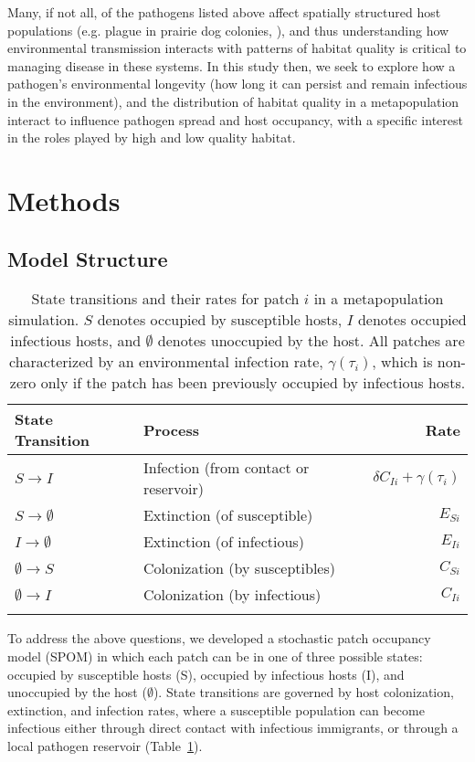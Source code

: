 \documentclass{svjour3}
\begin{document}
Many, if not all, of the pathogens listed above affect spatially structured host populations (e.g. plague in prairie dog colonies, \cite{George2013}), and thus understanding how environmental transmission interacts with patterns of habitat quality is critical to managing disease in these systems.  In this study then, we seek to explore how a pathogen's environmental longevity (how long it can persist and remain infectious in the environment), and the distribution of habitat quality in a metapopulation interact to influence pathogen spread and host occupancy, with a specific interest in the roles played by high and low quality habitat.  

\section{Methods}
\label{methods}

\subsection{Model Structure}

\begin{table}
\caption{State transitions and their rates for patch $i$ in a metapopulation simulation.  $S$ denotes occupied by  susceptible hosts, $I$ denotes occupied infectious hosts, and $\emptyset$ denotes unoccupied by the host.  All patches are characterized by an environmental infection rate, $\gamma(\tau_i)$, which is non-zero only if the patch has been previously occupied by infectious hosts.}
\begin{tabular}{llr}
State Transition & Process &  Rate \\
\hline
$S \rightarrow I$ & Infection (from contact or reservoir) & $\delta C_{Ii} + \gamma(\tau_i)$\\
$S \rightarrow \emptyset $ & Extinction (of susceptible) & $E_{Si}$\\
$I \rightarrow \emptyset $ & Extinction (of infectious) &  $E_{Ii}$ \\
$\emptyset \rightarrow S$ & Colonization (by susceptibles) & $C_{Si}$\\
$\emptyset \rightarrow I$ & Colonization (by infectious) & $C_{Ii}$\\
\label{transitions}
\end{tabular}
\end{table}

To address the above questions, we developed a stochastic patch occupancy model (SPOM) in which each patch can be in one of three possible states: occupied by susceptible hosts (S), occupied by infectious hosts (I), and unoccupied by the host ($\emptyset$).  State transitions are governed by host colonization, extinction, and infection rates, where a susceptible population can become infectious either through direct contact with infectious immigrants, or through a local pathogen reservoir (Table~\ref{transitions}).
\end{document}
